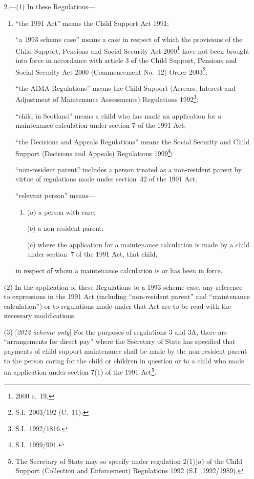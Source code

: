 \documentclass[12pt,a4paper]{article}
\begin{document}
2.---(1)  In these Regulations—
\begin{enumerate}\item[]
“the 1991 Act” means the Child Support Act 1991;

“a 1993 scheme case” means a case in respect of which the provisions of the Child Support, Pensions and Social Security Act 2000\footnote{2000 c.~19.} have not been brought into force in accordance with article 3 of the Child Support, Pensions and Social Security Act 2000 (Commencement No.~12) Order 2003\footnote{S.I.~2003/192 (C.~11).};

“the AIMA Regulations” means the Child Support (Arrears, Interest and Adjustment of Maintenance Assessments) Regulations 1992\footnote{S.I.~1992/1816.};

“child in Scotland” means a child who has made an application for a maintenance calculation under section 7 of the 1991 Act;

“the Decisions and Appeals Regulations” means the Social Security and Child Support (Decisions and Appeals) Regulations 1999\footnote{S.I.~1999/991.};

“non-resident parent” includes a person treated as a non-resident parent by virtue of regulations made under section~42 of the 1991 Act;

“relevant person” means—
\begin{enumerate}\item[]
($a$) 
a person with care;

($b$) 
a non-resident parent;

($c$) 
where the application for a maintenance calculation is made by a child under section~7 of the 1991 Act, that child,
\end{enumerate}
in respect of whom a maintenance calculation is or has been in force.
\end{enumerate}

(2) In the application of these Regulations to a 1993 scheme case, any reference to expressions in the 1991 Act (including “non-resident parent” and “maintenance calculation”) or to regulations made under that Act are to be read with the necessary modifications.

(3) [\emph{2012 scheme only}] For the purposes of regulations 3 and 3A, there are “arrangements for direct pay” where the Secretary of State has specified that payments of child support maintenance shall be made by the non-resident parent to the person caring for the child or children in question or to a child who made an application under section 7(1) of the 1991 Act\footnote{The Secretary of State may so specify under regulation 2(1)($a$)  of the Child Support (Collection and Enforcement) Regulations 1992 (S.I.~1992/1989).}.
\end{document}
